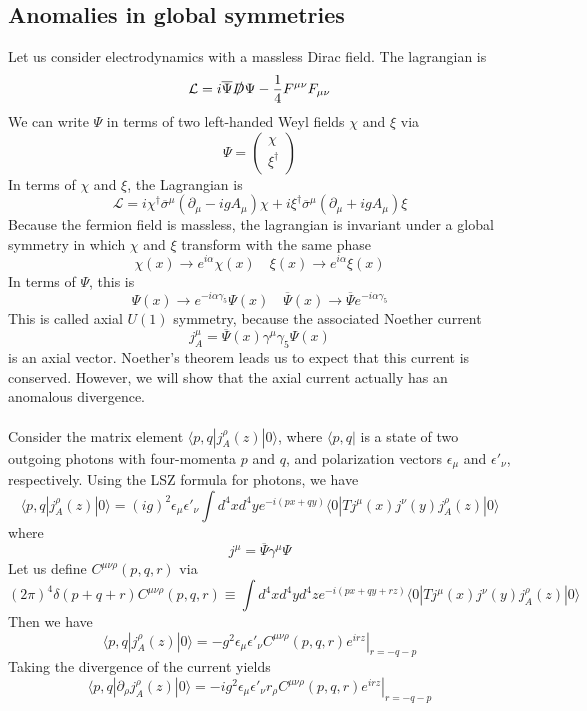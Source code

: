 \documentclass[cyan]{elegantnote}
\begin{document}
\subsection{Anomalies in global symmetries}
Let us consider electrodynamics with a massless Dirac field. The lagrangian is
\[\mathcal{L} = i\overline{\Psi}\slashed{D}\Psi - \frac{1}{4}F^{\mu\nu}F_{\mu\nu}\]
We can write $\Psi$ in terms of two left-handed Weyl fields $\chi$ and $\xi$ via
\[\Psi = \begin{pmatrix}
\chi \\ \xi^{\dagger}
\end{pmatrix}\]
In terms of $\chi$ and $\xi$, the Lagrangian is
\[\mathcal{L} = i\chi^{\dagger}\overline{\sigma}^{\mu} (\partial_{\mu} - igA_{\mu})\chi + i\xi^{\dagger}\overline{\sigma}^{\mu} (\partial_{\mu} + igA_{\mu})\xi\]
Because the fermion field is massless, the lagrangian is  invariant under a global symmetry in which $\chi$ and $\xi$ transform with the same phase
\[\chi(x) \to e^{i\alpha}\chi(x) \quad \xi(x) \to e^{i\alpha}\xi(x)\]
In terms of $\Psi$, this is
\[\Psi(x) \to e^{-i\alpha\gamma_5}\Psi(x) \quad \overline{\Psi}(x) \to \overline{\Psi} e^{-i\alpha\gamma_5}\]
This is called axial $U(1)$ symmetry, because the associated Noether current
\[j^{\mu}_A = \overline{\Psi}(x) \gamma^{\mu} \gamma_5 \Psi(x)\]
is an axial vector. Noether’s theorem leads us to expect that this current is conserved. However, we will show that the axial current actually has an anomalous divergence.
\\ \\
Consider the matrix element $\langle p,q | j^{\rho}_A(z) |  0 \rangle$, where $\langle p,q |$ is a state of two outgoing photons with four-momenta $p$ and $q$, and polarization vectors $\epsilon_{\mu}$ and $\epsilon'_{\nu}$, respectively. Using the LSZ formula for photons, we have
\[\langle p,q | j^{\rho}_A(z) |  0 \rangle = (ig)^2 \epsilon_{\mu} \epsilon'_{\nu} \int d^4x d^4y e^{-i(px+qy)} \langle 0 | T j^{\mu}(x) j^{\nu}(y) j^{\rho}_A(z) | 0 \rangle \]
where
\[j^{\mu} = \overline{\Psi}\gamma^{\mu}\Psi\]
Let us define $C^{\mu\nu\rho}(p,q,r)$ via
\[(2\pi)^4 \delta(p+q+r)C^{\mu\nu\rho}(p,q,r) \equiv  \int d^4x d^4y d^4z e^{-i(px+qy+rz)} \langle 0 | T j^{\mu}(x) j^{\nu}(y) j^{\rho}_A(z) | 0 \rangle\]
Then we have
\[\langle p,q | j^{\rho}_A(z) |  0 \rangle = -g^2 \epsilon_{\mu} \epsilon'_{\nu} \left. C^{\mu\nu\rho}(p,q,r) e^{irz} \right|_{r=-q-p}\]
Taking the divergence of the current yields
\[\langle p,q | \partial_{\rho} j^{\rho}_A(z) |  0 \rangle = -ig^2 \epsilon_{\mu} \epsilon'_{\nu} r_{\rho} \left. C^{\mu\nu\rho}(p,q,r) e^{irz} \right|_{r=-q-p}\]
\end{document}
